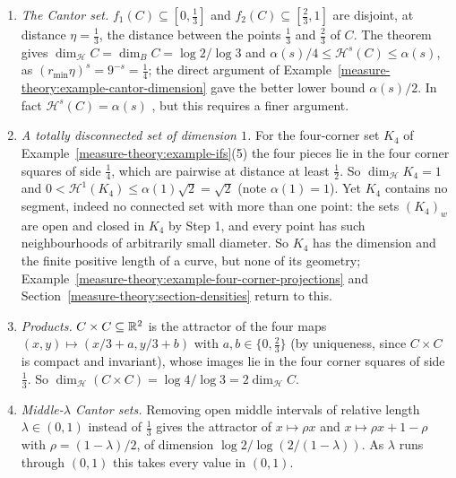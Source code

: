 \begin{example}\label{measure-theory:example-similarity-dimension}
\begin{enumerate}
\item \emph{The Cantor set.} $f_1(C) \subseteq [0, \frac13]$ and $f_2(C) \subseteq [\frac23, 1]$ are disjoint, at distance $\eta = \frac13$, the distance between the points $\frac13$ and $\frac23$ of $C$.
The theorem gives $\dim_{\mathcal{H}}C = \dim_BC = \log 2/\log 3$ and $\alpha(s)/4 \leq \mathcal{H}^s(C) \leq \alpha(s)$, as $(r_{\min}\eta)^s = 9^{-s} = \frac14$; the direct argument of
Example~\ref{measure-theory:example-cantor-dimension} gave the better lower bound $\alpha(s)/2$. In fact $\mathcal{H}^s(C) = \alpha(s)$ \cite{falconer-fractal}, but this requires a finer argument.
\item \emph{A totally disconnected set of dimension $1$.} For the four-corner set $K_4$ of Example~\ref{measure-theory:example-ifs}(5) the four pieces lie in the four corner squares of side $\frac14$,
which are pairwise at distance at least $\frac12$. So $\dim_{\mathcal{H}}K_4 = 1$ and $0 < \mathcal{H}^1(K_4) \leq \alpha(1)\sqrt2 = \sqrt2$ (note $\alpha(1) = 1$). Yet $K_4$ contains no segment, indeed no
connected set with more than one point: the sets $(K_4)_w$ are open and closed in $K_4$ by Step 1, and every point has such neighbourhoods of arbitrarily small diameter. So $K_4$ has the dimension and
the finite positive length of a curve, but none of its geometry; Example~\ref{measure-theory:example-four-corner-projections} and Section~\ref{measure-theory:section-densities} return to this.
\item \emph{Products.} $C \times C \subseteq \mathbb{R}^2$ is the attractor of the four maps $(x, y) \mapsto (x/3 + a, y/3 + b)$ with $a, b \in \{0, \frac23\}$ (by uniqueness, since $C \times C$ is compact and
invariant), whose images lie in the four corner squares of side $\frac13$. So $\dim_{\mathcal{H}}(C \times C) = \log 4/\log 3 = 2\dim_{\mathcal{H}}C$.
\item \emph{Middle-$\lambda$ Cantor sets.} Removing open middle intervals of relative length $\lambda \in (0, 1)$ instead of $\frac13$ gives the attractor of $x \mapsto \rho x$ and
$x \mapsto \rho x + 1 - \rho$ with $\rho = (1 - \lambda)/2$, of dimension $\log 2/\log(2/(1 - \lambda))$. As $\lambda$ runs through $(0, 1)$ this takes every value in $(0, 1)$.
\end{enumerate}
\end{example}

